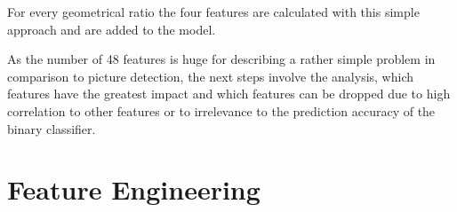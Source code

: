 For every geometrical ratio the four features are calculated with this simple approach and are added to the model.

\parbreak

As the number of 48 features is huge for describing a rather simple problem in comparison to picture detection, the next steps
involve the analysis, which features have the greatest impact and which features can be dropped due to high correlation to other
features or to irrelevance to the prediction accuracy of the binary classifier.

\section{Feature Engineering}
\label{sec:feature_engineering}
